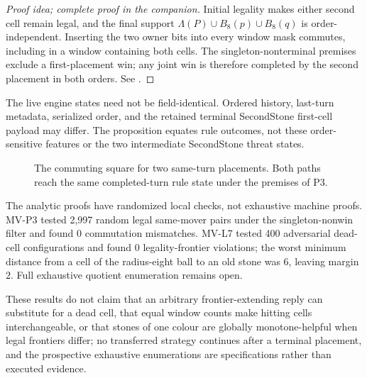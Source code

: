 \begin{proof}[Proof idea; complete proof in the companion]
Initial legality makes either second cell remain legal, and the final support
$\Lambda(P)\cup B_8(p)\cup B_8(q)$ is order-independent.  Inserting the two
owner bits into every window mask commutes, including in a window containing
both cells.  The singleton-nonterminal premises exclude a first-placement
win; any joint win is therefore completed by the second placement in both
orders.  See \cite{hexobot-companions}.
\end{proof}

The live engine states need not be field-identical.  Ordered history,
last-turn metadata, serialized order, and the retained terminal
\textup{SecondStone} first-cell payload may differ.  The proposition equates
rule outcomes, not these order-sensitive features or the two intermediate
\textup{SecondStone} threat states.

\begin{figure}[tbp]
  \centering
  \caption{The commuting square for two same-turn placements.  Both paths
  reach the same completed-turn rule state under the premises of P3.}
  \label{fig:commutation}
\end{figure}

The analytic proofs have randomized local checks, not exhaustive machine
proofs.  MV-P3 tested 2,997 random legal same-mover pairs under the
singleton-nonwin filter and found 0 commutation mismatches.  MV-L7 tested 400
adversarial dead-cell configurations and found 0 legality-frontier violations;
the worst minimum distance from a cell of the radius-eight ball to an old
stone was $6$, leaving margin $2$.  Full exhaustive quotient enumeration
remains open.

These results do not claim that an arbitrary frontier-extending reply can
substitute for a dead cell, that equal window counts make hitting cells
interchangeable, or that stones of one colour are globally monotone-helpful
when legal frontiers differ; no transferred strategy continues after a
terminal placement, and the prospective exhaustive enumerations are
specifications rather than executed evidence.
